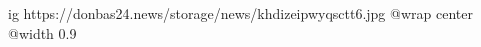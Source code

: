  
 
 
 
 

\ifcmt
  ig https://donbas24.news/storage/news/khdizeipwyqsctt6.jpg
  @wrap center
  @width 0.9
\fi
